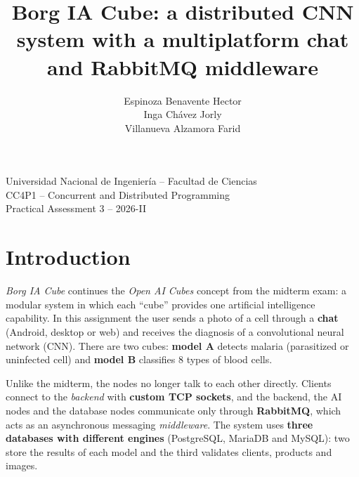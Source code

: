 \documentclass[10pt,a4paper]{article}
\begin{document}
\title{\textbf{Borg IA Cube: a distributed CNN system with a multiplatform chat and RabbitMQ middleware}}

\author{
Espinoza Benavente Hector \\
Inga Chávez Jorly \\
Villanueva Alzamora Farid
}

\date{}
\maketitle

\begin{center}
Universidad Nacional de Ingeniería -- Facultad de Ciencias\\[4pt]
CC4P1 -- Concurrent and Distributed Programming\\
Practical Assessment 3 -- 2026-II
\end{center}

\vspace{10pt}
\setcounter{tocdepth}{2}
\tableofcontents
\newpage

\section{Introduction}

\textit{Borg IA Cube} continues the \textit{Open AI Cubes} concept from the midterm exam: a modular
system in which each \textquotedblleft{}cube\textquotedblright{} provides one artificial intelligence
capability. In this assignment the user sends a photo of a cell through a \textbf{chat} (Android,
desktop or web) and receives the diagnosis of a convolutional neural network (CNN). There are two
cubes: \textbf{model A} detects malaria (parasitized or uninfected cell) and \textbf{model B}
classifies 8 types of blood cells.

Unlike the midterm, the nodes no longer talk to each other directly. Clients connect to the
\textit{backend} with \textbf{custom TCP sockets}, and the backend, the AI nodes and the database nodes
communicate only through \textbf{RabbitMQ}, which acts as an asynchronous messaging
\textit{middleware}. The system uses \textbf{three databases with different engines} (PostgreSQL,
MariaDB and MySQL): two store the results of each model and the third validates clients, products and
images.
\end{document}
